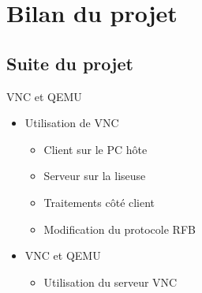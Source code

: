 \section[Bilan]{Bilan du projet}
\subsection[Suite]{Suite du projet}

\begin{frame}{VNC et QEMU}

\begin{itemize}

\item Utilisation de VNC
	\begin{itemize}
		\item Client sur le PC hôte
		\item Serveur sur la liseuse
		\item Traitements côté client
		\item Modification du protocole RFB
	\end{itemize}

\item VNC et QEMU
	\begin{itemize}
		\item Utilisation du serveur VNC 
	\end{itemize}

\end{itemize}
\end{frame}